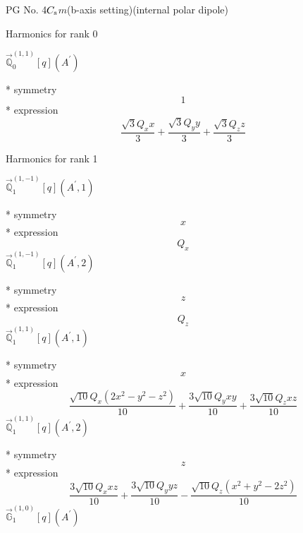 \documentclass[fleqn,8pt]{jsarticle}
\begin{document}
\setcounter{MaxMatrixCols}{32}

\renewcommand{\tablename}{Table~}
\renewcommand{\figurename}{Figure~}
\begin{center}
\LARGE
PG No. 4\quad$C_{\rm s}$\quad$m$\quad(b-axis setting)\quad[ monoclinic ] (internal polar dipole)
\end{center}

\noindent * Harmonics for rank 0

\noindent\quad $\vec{\mathbb{Q}}_{0}^{(1,1)}[q](A^{\prime})$

\noindent\quad ** symmetry
\begin{dmath*}
1
\end{dmath*}
\noindent\quad ** expression
\begin{dmath*}
\frac{\sqrt{3} Q_{x} x}{3} + \frac{\sqrt{3} Q_{y} y}{3} + \frac{\sqrt{3} Q_{z} z}{3}
\end{dmath*}

\noindent * Harmonics for rank 1

\noindent\quad $\vec{\mathbb{Q}}_{1}^{(1,-1)}[q](A^{\prime},1)$

\noindent\quad ** symmetry
\begin{dmath*}
x
\end{dmath*}
\noindent\quad ** expression
\begin{dmath*}
Q_{x}
\end{dmath*}
\noindent\quad $\vec{\mathbb{Q}}_{1}^{(1,-1)}[q](A^{\prime},2)$

\noindent\quad ** symmetry
\begin{dmath*}
z
\end{dmath*}
\noindent\quad ** expression
\begin{dmath*}
Q_{z}
\end{dmath*}
\noindent\quad $\vec{\mathbb{Q}}_{1}^{(1,1)}[q](A^{\prime},1)$

\noindent\quad ** symmetry
\begin{dmath*}
x
\end{dmath*}
\noindent\quad ** expression
\begin{dmath*}
\frac{\sqrt{10} Q_{x} \left(2 x^{2} - y^{2} - z^{2}\right)}{10} + \frac{3 \sqrt{10} Q_{y} x y}{10} + \frac{3 \sqrt{10} Q_{z} x z}{10}
\end{dmath*}
\noindent\quad $\vec{\mathbb{Q}}_{1}^{(1,1)}[q](A^{\prime},2)$

\noindent\quad ** symmetry
\begin{dmath*}
z
\end{dmath*}
\noindent\quad ** expression
\begin{dmath*}
\frac{3 \sqrt{10} Q_{x} x z}{10} + \frac{3 \sqrt{10} Q_{y} y z}{10} - \frac{\sqrt{10} Q_{z} \left(x^{2} + y^{2} - 2 z^{2}\right)}{10}
\end{dmath*}
\noindent\quad $\vec{\mathbb{G}}_{1}^{(1,0)}[q](A^{\prime})$
\end{document}

